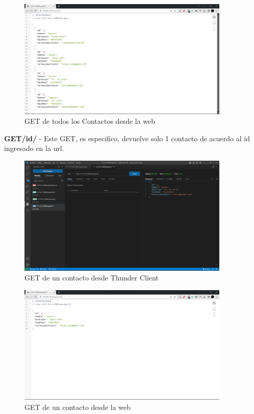\documentclass{article}
\begin{document}
        \begin{figure}[H]
            \centering
            \includegraphics[width=0.9\textwidth,keepaspectratio]{img/DjangoApiRest/getWeb1.png}
            \caption{GET de todos los Contactos desde la web}
            \label{fig:enter-label}
        \end{figure}

    \textbf{GET/id/} - 
    Este GET, es especifico, devuelve solo 1 contacto de acuerdo al id ingresado en la url.
        \begin{figure}[H]
            \centering
            \includegraphics[width=0.9\textwidth,keepaspectratio]{img/DjangoApiRest/get2.png}
            \caption{GET de un contacto desde Thunder Client}
            \label{fig:enter-label}
        \end{figure}

        \begin{figure}[H]
            \centering
            \includegraphics[width=0.9\textwidth,keepaspectratio]{img/DjangoApiRest/getWEB2.png}
            \caption{GET de un contacto desde la web}
            \label{fig:enter-label}
        \end{figure}
\end{document}
